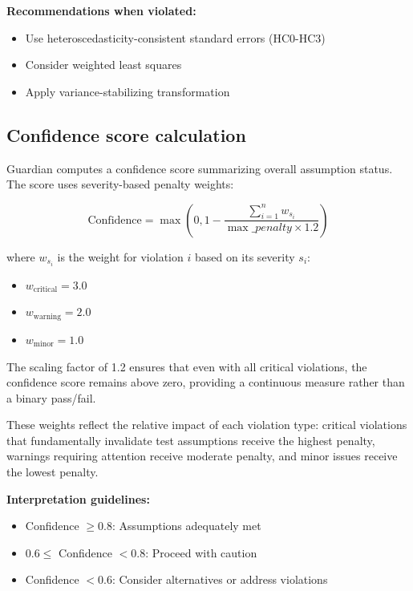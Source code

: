 \documentclass[article]{jss}
\begin{document}
\textbf{Recommendations when violated:}
\begin{itemize}
\item Use heteroscedasticity-consistent standard errors (HC0-HC3)
\item Consider weighted least squares
\item Apply variance-stabilizing transformation
\end{itemize}

\subsection{Confidence score calculation}

Guardian computes a confidence score summarizing overall assumption status. The score uses severity-based penalty weights:

\begin{equation}
\text{Confidence} = \max\left(0, 1 - \frac{\sum_{i=1}^{n} w_{s_i}}{\max\_penalty \times 1.2}\right)
\end{equation}

where $w_{s_i}$ is the weight for violation $i$ based on its severity $s_i$:

\begin{itemize}
\item $w_{\text{critical}} = 3.0$
\item $w_{\text{warning}} = 2.0$
\item $w_{\text{minor}} = 1.0$
\end{itemize}

The scaling factor of 1.2 ensures that even with all critical violations, the confidence score remains above zero, providing a continuous measure rather than a binary pass/fail.

These weights reflect the relative impact of each violation type: critical violations that fundamentally invalidate test assumptions receive the highest penalty, warnings requiring attention receive moderate penalty, and minor issues receive the lowest penalty.

\textbf{Interpretation guidelines:}
\begin{itemize}
\item Confidence $\geq 0.8$: Assumptions adequately met
\item $0.6 \leq$ Confidence $< 0.8$: Proceed with caution
\item Confidence $< 0.6$: Consider alternatives or address violations
\end{itemize}
\end{document}
